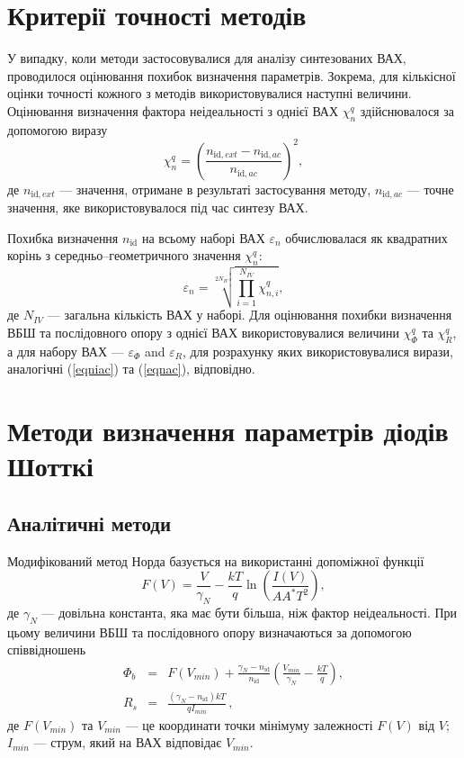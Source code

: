 \section{Критерії точності методів}
У випадку, коли методи застосовувалися для аналізу синтезованих ВАХ, проводилося оцінювання похибок визначення параметрів.
Зокрема, для кількісної оцінки точності кожного з методів використовувалися наступні величини.
Оцінювання визначення фактора неідеальності з однієї ВАХ $\chi^q_n$ здійснювалося за допомогою виразу
\begin{equation}
\label{eqniac}
\chi^q_n=\left(\frac{n_{\mathrm{id},ext}-n_{\mathrm{id},ac}}{n_{\mathrm{id},ac}}\right)^2,
\end{equation}
де
$n_{\mathrm{id},ext}$ --- значення, отримане в результаті застосування методу,
$n_{\mathrm{id},ac}$ --- точне значення, яке використовувалося під час синтезу ВАХ.


Похибка визначення $n_\mathrm{id}$ на всьому наборі ВАХ $\varepsilon_n$ обчислювалася  як квадратних корінь з середньо--геометричного значення $\chi^q_n$:
\begin{equation}
\label{eqnac}
\varepsilon_n=\sqrt[2N_{I\!V}]{\prod_{i=1}^{N_{I\!V}}\chi^q_{n,i}},
\end{equation}
де
$N_{I\!V}$ --- загальна кількість ВАХ у наборі.
Для оцінювання похибки визначення ВБШ та послідовного опору з однієї ВАХ використовувалися величини  $\chi^q_\Phi$ та $\chi^q_R$, а для набору ВАХ --- $\varepsilon_\Phi$ and $\varepsilon_R$, для розрахунку яких використовувалися вирази, аналогічні (\ref{eqniac}) та (\ref{eqnac}), відповідно.

\section{Методи визначення параметрів діодів Шотткі}
\subsection{Аналітичні методи\label{AnMethod}}
Модифікований метод Норда \cite{Norde,Lien,Sato,Dermircioglu:Norde} базується на використанні допоміжної функції
\begin{equation}
\label{eqNorde}
F(V)=\frac{V}{\gamma_N}-\frac{kT}{q}\ln\left(\frac{I(V)}{AA^*T^2}\right),
\end{equation}
де
$\gamma_N$ --- довільна константа, яка має бути більша, ніж фактор неідеальності.
При цьому величини ВБШ та послідовного опору визначаються за допомогою співвідношень
\begin{eqnarray}
\label{eqNordDet}
\Phi_b&=&F(V_{min})+\frac{\gamma_N-n_\mathrm{id}}{n_\mathrm{id}}\left(\frac{V_{min}}{\gamma_N}-\frac{kT}{q}\right),
\\
R_s&=&\frac{(\gamma_N-n_\mathrm{id})kT}{qI_{min}}\,,
\end{eqnarray}
де
$F(V_{min})$ та $V_{min}$ --- це координати точки мінімуму залежності $F(V)$ від $V$;
$I_{min}$  --- струм, який на ВАХ відповідає $V_{min}$.

